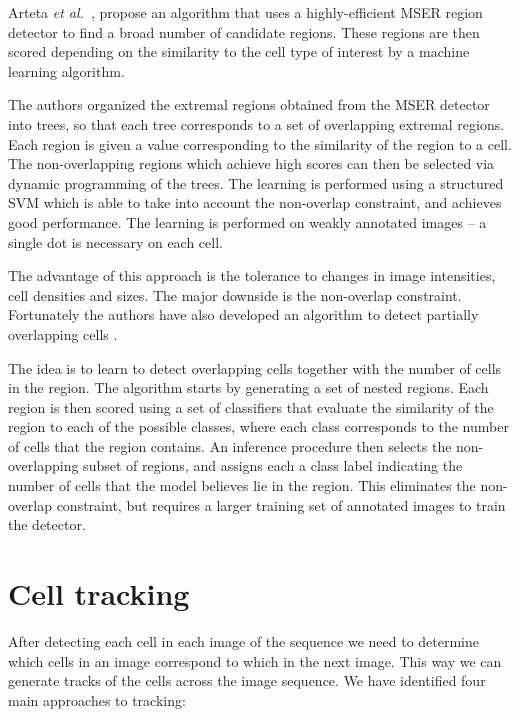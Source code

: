 Arteta \emph{et al.}~\cite{arteta12, arteta13}, propose an algorithm that uses a highly-efficient MSER region detector \cite{matas02} to find a broad number of candidate regions. These regions are then scored depending on the similarity to the cell type of interest by a machine learning algorithm. 

The authors organized the extremal regions obtained from the MSER detector into trees, so that each tree corresponds to a set of overlapping extremal regions. Each region is given a value corresponding to the similarity of the region to a cell. The non-overlapping regions which achieve high scores can then be selected via dynamic programming of the trees. The learning is performed using a structured SVM \cite{joachims09} which is able to take into account the non-overlap constraint, and achieves good performance. The learning is performed on weakly annotated images -- a single dot is necessary on each cell.

The advantage of this approach is the tolerance to changes in image intensities, cell densities and sizes. The major downside is the non-overlap constraint. Fortunately the authors have also developed an algorithm to detect partially overlapping cells \cite{arteta13}. 

The idea is to learn to detect overlapping cells together with the number of cells in the region. The algorithm starts by generating a set of nested regions. Each region is then scored using a set of classifiers that evaluate the similarity of the region to each of the possible classes, where each class corresponds to the number of cells that the region contains. An inference procedure then selects the non-overlapping subset of regions, and assigns each a class label indicating the number of cells that the model believes lie in the region. This eliminates the non-overlap constraint, but requires a larger training set of annotated images to train the detector.

\section{Cell tracking \statusfirstdraft}
\label{sec:tracking}

After detecting each cell in each image of the sequence we need to determine which cells in an image correspond to which in the next image. This way we can generate tracks of the cells across the image sequence. We have identified four main approaches to tracking:

